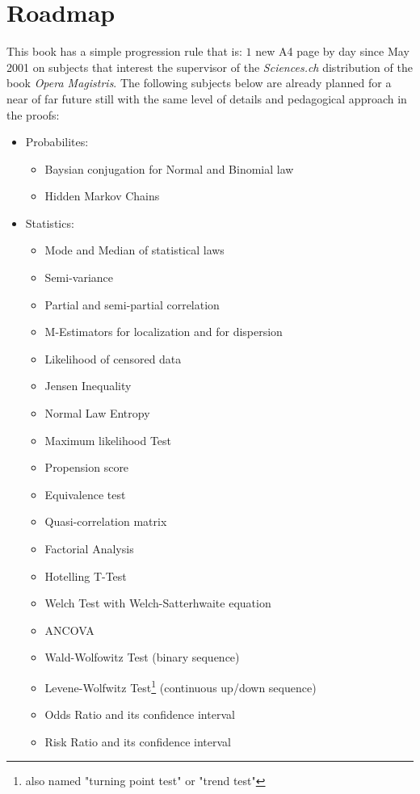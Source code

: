 	\section{Roadmap}
	This book has a simple progression rule that is: $1$ new A4 page by day since May 2001 on subjects that interest the supervisor of the \textit{Sciences.ch} distribution of the book \textit{Opera Magistris}. The following subjects below are already planned for a near of far future still with the same level of details and pedagogical approach in the proofs:
	\begin{itemize}
		\item Probabilites:
			\begin{itemize}
				\item Baysian conjugation for Normal and Binomial law
				\item Hidden Markov Chains
			\end{itemize}
		\item Statistics: 
			\begin{itemize}
				\item Mode and Median of statistical laws				
				\item Semi-variance	
				\item Partial and semi-partial correlation
				\item M-Estimators for localization and for dispersion
				\item Likelihood of censored data
				\item Jensen Inequality
				\item Normal Law Entropy
				\item Maximum likelihood Test
				\item Propension score
				\item Equivalence test
				\item Quasi-correlation matrix
				\item Factorial Analysis
				\item Hotelling T-Test
				\item Welch Test with Welch-Satterhwaite equation
				\item ANCOVA
				\item Wald-Wolfowitz Test (binary sequence)
				\item Levene-Wolfwitz Test\footnote{also named "turning point test" or "trend test"} (continuous up/down sequence)
				\item Odds Ratio and its confidence interval
				\item Risk Ratio and its confidence interval

\end{itemize}
\end{itemize}
